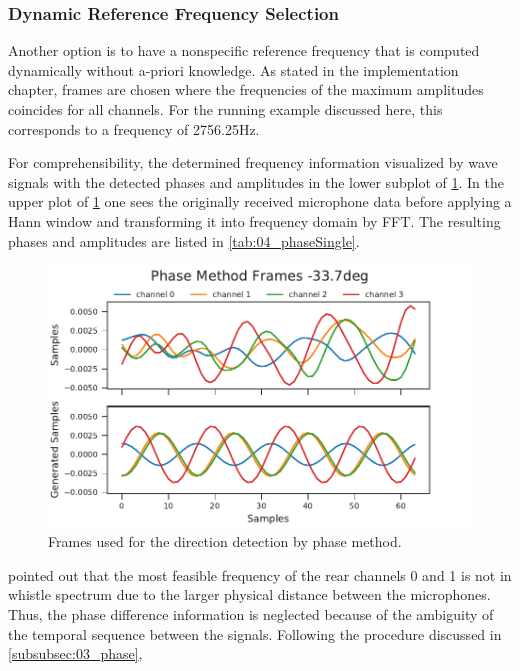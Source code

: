 \subsubsection*{Dynamic Reference Frequency Selection}

Another option is to have a nonspecific reference frequency that
is computed dynamically without a-priori knowledge.
As stated in the implementation chapter, frames are chosen where the frequencies
of the maximum amplitudes coincides for all channels.
For the running example discussed here, this corresponds to a frequency of 2756.25\si{\hertz}.

For comprehensibility, the determined frequency information visualized by
wave signals with the detected phases and amplitudes
in the lower subplot of \cref{fig:04_phaseSingle}.
In the upper plot of \cref{fig:04_phaseSingle} one sees the originally received microphone
data before applying a Hann window and transforming it into frequency domain by
\ac{FFT}. The resulting phases and amplitudes are listed in
\cref{tab:04_phaseSingle}.
\begin{figure}[h]
	\centering
	\includegraphics[]{figures/evaluation/phase_cos}
	\caption{Frames used for the direction detection by phase method.}
	\label{fig:04_phaseSingle}
\end{figure}
 pointed out that the most feasible frequency
of the rear channels 0 and 1 is not in whistle spectrum
due to the larger physical distance between the microphones.
Thus, the phase difference information is neglected because of the ambiguity of
the temporal sequence between the signals.
Following the procedure discussed in \cref{subsubsec:03_phase},
